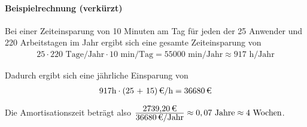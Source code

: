 \paragraph{Beispielrechnung (verkürzt)}
Bei einer Zeiteinsparung von 10 Minuten am Tag für jeden der 25 Anwender und 220 Arbeitstagen im Jahr ergibt sich eine gesamte Zeiteinsparung von 
\begin{eqnarray}
25 \cdot 220 \mbox{ Tage/Jahr} \cdot 10 \mbox{ min/Tag} = 55000 \mbox{ min/Jahr} \approx 917 \mbox{ h/Jahr} 
\end{eqnarray}

Dadurch ergibt sich eine jährliche Einsparung von 
\begin{eqnarray}
917 \mbox{h} \cdot \eur{(25 + 15)}{\mbox{/h}} = \eur{36680}
\end{eqnarray}

Die Amortisationszeit beträgt also $\frac{\eur{2739,20}}{\eur{36680}\mbox{/Jahr}} \approx 0,07 \mbox{ Jahre} \approx 4 \mbox{ Wochen}$.